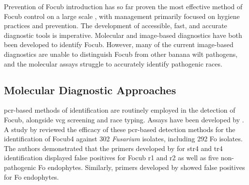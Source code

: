 Prevention of \ac{Focub} introduction has so far proven the most effective method of \ac{Focub} control on a large scale \parencite{Ploetz2015b}, with management primarily focused on hygiene practices and prevention. The development of accessible, fast, and accurate diagnostic tools is imperative. Molecular and image-based diagnostics have both been developed to identify \ac{Focub}. However, many of the current image-based diagnostics are unable to distinguish \ac{Focub} from other banana wilt pathogens, and the molecular assays struggle to accurately identify pathogenic races.  

\subsection{Molecular Diagnostic Approaches}
\Ac{pcr}-based methods of identification are routinely employed in the detection of \ac{Focub}, alongside \ac{vcg} screening and race typing. Assays have been developed by \textcite{Lin2009, Dita2010, Li2013a, Li2013b}. A study by \textcite{Magdama2019} reviewed the efficacy of these \ac{pcr}-based detection methods for the identification of \ac{Focub4} against 302 \textit{Fusarium} isolates, including 292 \ac{Fo} isolates. The authors demonstrated that the primers developed by \textcite{Lin2009, Li2013a} for \ac{str4} and \ac{tr4} identification displayed false positives for \ac{Focub} \ac{r1} and \ac{r2} as well as five non-pathogenic \ac{Fo} endophytes. Similarly, primers developed by \textcite{Dita2010} showed false positives for \ac{Fo} endophytes. 

